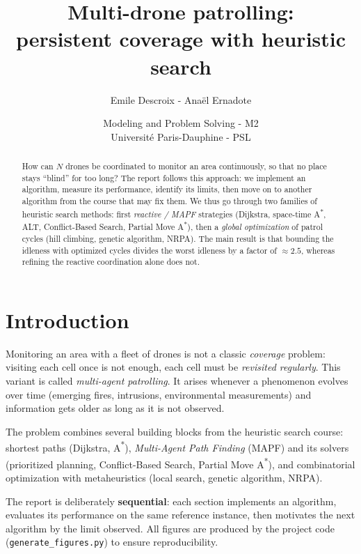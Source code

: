 \documentclass[11pt,a4paper]{article}
\title{\textbf{Multi-drone patrolling:\\ persistent coverage with heuristic search}}
\author{Emile Descroix - Anaël Ernadote}
\date{Modeling and Problem Solving - M2\\ Université Paris-Dauphine - PSL}
\begin{document}
\maketitle

\begin{abstract}
\noindent
How can $N$ drones be coordinated to monitor an area continuously, so that no
place stays ``blind'' for too long? The report follows this approach: we
implement an algorithm, measure its performance, identify its limits, then move
on to another algorithm from the course that may fix them. We thus go through two
families of heuristic search methods: first \emph{reactive / MAPF} strategies
(Dijkstra, space-time A\textsuperscript{*}, ALT, Conflict-Based Search, Partial
Move A\textsuperscript{*}), then a \emph{global optimization} of patrol cycles
(hill climbing, genetic algorithm, NRPA). The main result is that bounding the
idleness with optimized cycles divides the worst idleness by a factor of
$\approx 2.5$, whereas refining the reactive coordination alone does not.
\end{abstract}

\newpage
\tableofcontents
\newpage

\section{Introduction}

Monitoring an area with a fleet of drones is not a classic \emph{coverage}
problem: visiting each cell once is not enough, each cell must be
\emph{revisited regularly}. This variant is called \emph{multi-agent
patrolling}. It arises whenever a phenomenon evolves over time (emerging fires,
intrusions, environmental measurements) and information gets older as long as it
is not observed.

The problem combines several building blocks from the heuristic search course:
shortest paths (Dijkstra, A\textsuperscript{*}), \emph{Multi-Agent Path Finding}
(MAPF) and its solvers (prioritized planning, Conflict-Based Search, Partial Move
A\textsuperscript{*}), and combinatorial optimization with metaheuristics (local
search, genetic algorithm, NRPA).

The report is deliberately \textbf{sequential}: each section implements an
algorithm, evaluates its performance on the same reference instance, then
motivates the next algorithm by the limit observed. All figures are produced by
the project code (\texttt{generate\_figures.py}) to ensure reproducibility.
\end{document}
